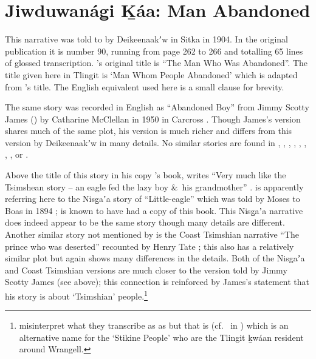 
\resetexcnt
\chapter{Jiwduwanág̱i Ḵáa: Man Abandoned}\label{ch:90-man-abandoned}

This narrative was told to \citeauthor{swanton:1909} by Deikeenaakʼw in Sitka in 1904.
In the original publication it is number 90, running from page 262 to 266 and totalling 65 lines of glossed transcription.
\citeauthor{swanton:1909}’s original title is “The Man Who Was Abandoned”.
The title given here in Tlingit is  ‘Man Whom People Abandoned’ which is adapted from \citeauthor{swanton:1909}’s title.
The English equivalent used here is a small clause for brevity.

The same story was recorded in English as “Abandoned Boy” from  Jimmy Scotty James () by Catharine McClellan in 1950 in Carcross \parencite[384–390]{mcclellan-cruikshank:2007b}.
Though James’s version shares much of the same plot, his version is much richer and differs from this version by Deikeenaakʼw in many details.
No similar stories are found in \textcite{veniaminov:1846}, \textcite{judson:1911}, \textcite{jones:1914}, \textcites{velten:1939}{velten:1944}, \textcite{salisbury:1962}, \textcite{olson:1967}, \textcite{de-laguna:1972}, \textcite{dauenhauer:1987}, or \textcite{emmons:1991}.

Above the title of this story in his copy \citeauthor{swanton:1909}’s book, \citeauthor{paul:1930} writes “Very much like the Tsimshean story – an eagle fed the lazy boy \&\ his grandmother” \parencite[262]{paul:1930}.
\citeauthor{paul:1930} is apparently referring here to the Nisg̱aʼa story of “Little-eagle” which was told by Moses to Boas in 1894 \parencite[169–187]{boas:1902}; \citeauthor{paul:1930} is known to have had a copy of this book.
This Nisg̱aʼa narrative does indeed appear to be the same story though many details are different.
Another similar story not mentioned by \citeauthor{paul:1930} is the Coast Tsimshian narrative “The prince who was deserted” recounted by Henry Tate \parencite[225–232]{boas-tate:1916}; this also has a relatively similar plot but again shows many differences in the details.
Both of the Nisg̱aʼa and Coast Tsimshian versions are much closer to the version told by Jimmy Scotty James (see above); this connection is reinforced by James’s statement that his story is about  ‘Tsimshian’ people.\footnote{\textcite[384]{mcclellan-cruikshank:2007b} misinterpret what they transcribe as  as  but that is  (cf.\  in \cite[396]{swanton:1908}) which is an alternative name for the  ‘Stikine People’ who are the Tlingit ḵwáan resident around Wrangell.} 

